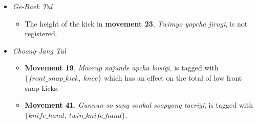 \documentclass[10pt,twocolumn,a4paper]{article}
\newcommand{\Section}[1]{\vspace{-8pt}\section{\hskip -1em.~~#1}\vspace{-3pt}}
\begin{document}
\begin{itemize}
  \item
    \emph{Ge-Baek Tul}
    \begin{itemize}
      \item
        The height of the kick in {\bf movement 23}, \emph{Twimyo yopcha
        jirugi}, is not registered.
    \end{itemize}
  \item
    \emph{Choong-Jang Tul}
    \begin{itemize}
      \item
        {\bf Movement 19}, \emph{Moorup najunde apcha busigi}, is tagged with
        $\{front\_snap\_kick, \: knee\}$ which has an effect on the total of
        low front snap kicks.
      \item
        {\bf Movement 41}, \emph{Gunnun so sang sonkal soopyong taerigi}, is
        tagged with $\{knife\_hand, \: twin\_knife\_hand\}$.
    \end{itemize}
\end{itemize}






































\end{document}
